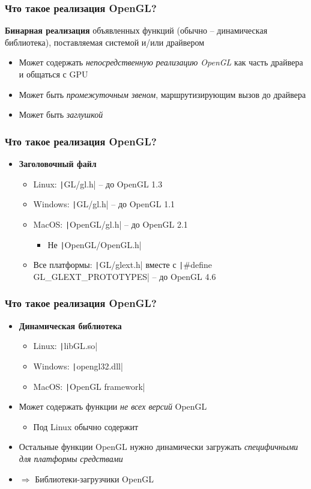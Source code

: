 \documentclass[10pt]{beamer}
\begin{document}
\begin{frame}[fragile]
\frametitle{Что такое реализация OpenGL?}
\pause
\textbf{Бинарная реализация} объявленных функций (обычно -- динамическая библиотека), поставляемая системой и/или драйвером
\begin{itemize}
\item Может содержать \textit{непосредственную реализацию OpenGL} как часть драйвера и общаться с GPU
\item Может быть \textit{промежуточным звеном}, маршрутизирующим вызов до драйвера
\item Может быть \textit{заглушкой}
\end{itemize}
\end{frame}

\begin{frame}[fragile]
\frametitle{Что такое реализация OpenGL?}
\begin{itemize}
\item \textbf{Заголовочный файл}
\begin{itemize}
\item Linux: \texttt|GL/gl.h| -- до OpenGL 1.3
\pause
\item Windows: \texttt|GL/gl.h| -- до OpenGL 1.1
\pause
\item MacOS: \texttt|OpenGL/gl.h| -- до OpenGL 2.1
\begin{itemize}
\item {\color{red}Не} \texttt|OpenGL/OpenGL.h|
\end{itemize}
\item Все платформы: \texttt|GL/glext.h| вместе с \texttt|#define GL_GLEXT_PROTOTYPES| -- до OpenGL 4.6
\end{itemize}
\end{itemize}
\end{frame}

\begin{frame}[fragile]
\frametitle{Что такое реализация OpenGL?}
\begin{itemize}
\item \textbf{Динамическая библиотека}
\begin{itemize}
\item Linux: \texttt|libGL.so|
\item Windows: \texttt|opengl32.dll|
\item MacOS: \texttt|OpenGL framework|
\end{itemize}
\pause
\item Может содержать функции \textit{не всех версий} OpenGL
\begin{itemize}
\item Под Linux обычно содержит
\end{itemize}
\item Остальные функции OpenGL нужно динамически загружать \textit{специфичными для платформы средствами}
\item $\Longrightarrow$ Библиотеки-загрузчики OpenGL
\end{itemize}
\end{frame}
\end{document}
